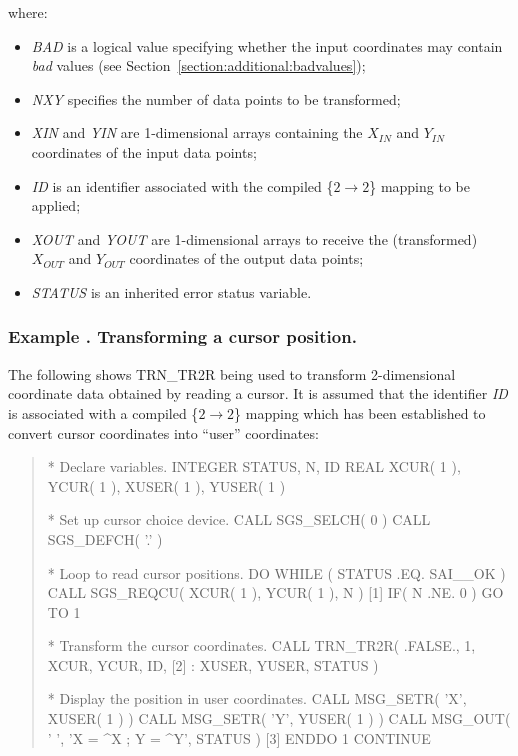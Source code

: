 \documentclass[twoside,nolof,11pt]{starlink}
\providecommand{\name}[1]{\small{#1}}
\providecommand{\fortvar}[1]{\emph{#1}}
\newcounter{examplecounter}
\providecommand{\example}[1]{\addtocounter{examplecounter}{1}
                         \subsubsection*{Example \theexamplecounter. #1}}
\begin{document}
where:

\begin{itemize}

\item \fortvar{BAD} is a logical value specifying whether the input
coordinates may contain \emph{bad} values (see
Section~\ref{section:additional:badvalues});

\item \fortvar{NXY} specifies the number of data points to be transformed;

\item \fortvar{XIN} and \fortvar{YIN} are 1-dimensional arrays containing
the $X_{IN}$ and $Y_{IN}$ coordinates of the input data points;

\item \fortvar{ID} is an identifier associated with the compiled
\mbox{\{$2 \rightarrow 2$\}} mapping to be applied;

\item \fortvar{XOUT} and \fortvar{YOUT} are 1-dimensional arrays to receive
the (transformed) $X_{OUT}$ and $Y_{OUT}$ coordinates of the output data
points;

\item \fortvar{STATUS} is an inherited error status variable.

\end{itemize}

\example{Transforming a cursor position.}
The following shows \name{TRN\_TR2R} being used to transform 2-dimensional
coordinate data obtained by reading a cursor.
It is assumed that the identifier \fortvar{ID} is associated with a compiled
\mbox{\{$2 \rightarrow 2$\}} mapping which has been established to convert
cursor coordinates into ``user'' coordinates:

\begin{quote}
\begin{terminalv}
*  Declare variables.
      INTEGER STATUS, N, ID
      REAL XCUR( 1 ), YCUR( 1 ), XUSER( 1 ), YUSER( 1 )

*  Set up cursor choice device.
      CALL SGS_SELCH( 0 )
      CALL SGS_DEFCH( '.' )

*  Loop to read cursor positions.
      DO WHILE ( STATUS .EQ. SAI__OK )
         CALL SGS_REQCU( XCUR( 1 ), YCUR( 1 ), N )      [1]
         IF( N .NE. 0 ) GO TO 1

*  Transform the cursor coordinates.
         CALL TRN_TR2R( .FALSE., 1, XCUR, YCUR, ID,     [2]
     :                  XUSER, YUSER, STATUS )

*  Display the position in user coordinates.
         CALL MSG_SETR( 'X', XUSER( 1 ) )
         CALL MSG_SETR( 'Y', YUSER( 1 ) )
         CALL MSG_OUT( ' ', 'X = ^X ; Y = ^Y', STATUS ) [3]
      ENDDO
    1 CONTINUE

\end{terminalv}
\end{quote}
\end{document}
